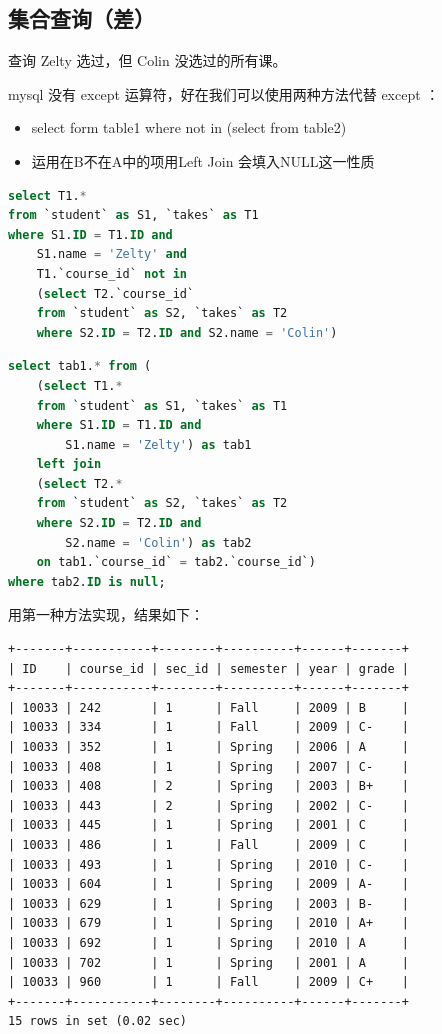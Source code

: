 \documentclass{article}
\begin{document}
\subsection{集合查询（差）}

查询 Zelty 选过，但 Colin 没选过的所有课。

mysql 没有 except 运算符，好在我们可以使用两种方法代替 except ：

\begin{itemize}
\item select form table1 where not in (select from table2)
\item 运用在B不在A中的项用Left Join 会填入NULL这一性质
\end{itemize}

\begin{lstlisting}[language=sql]
select T1.*
from `student` as S1, `takes` as T1
where S1.ID = T1.ID and 
	S1.name = 'Zelty' and
    T1.`course_id` not in
	(select T2.`course_id`
	from `student` as S2, `takes` as T2
	where S2.ID = T2.ID and S2.name = 'Colin')
\end{lstlisting}

\begin{lstlisting}[language=sql]
select tab1.* from (
	(select T1.*
	from `student` as S1, `takes` as T1
	where S1.ID = T1.ID and 
		S1.name = 'Zelty') as tab1
	left join
	(select T2.*
	from `student` as S2, `takes` as T2
	where S2.ID = T2.ID and
		S2.name = 'Colin') as tab2
	on tab1.`course_id` = tab2.`course_id`)
where tab2.ID is null;
\end{lstlisting}


用第一种方法实现，结果如下：

\begin{lstlisting}
+-------+-----------+--------+----------+------+-------+
| ID    | course_id | sec_id | semester | year | grade |
+-------+-----------+--------+----------+------+-------+
| 10033 | 242       | 1      | Fall     | 2009 | B     |
| 10033 | 334       | 1      | Fall     | 2009 | C-    |
| 10033 | 352       | 1      | Spring   | 2006 | A     |
| 10033 | 408       | 1      | Spring   | 2007 | C-    |
| 10033 | 408       | 2      | Spring   | 2003 | B+    |
| 10033 | 443       | 2      | Spring   | 2002 | C-    |
| 10033 | 445       | 1      | Spring   | 2001 | C     |
| 10033 | 486       | 1      | Fall     | 2009 | C     |
| 10033 | 493       | 1      | Spring   | 2010 | C-    |
| 10033 | 604       | 1      | Spring   | 2009 | A-    |
| 10033 | 629       | 1      | Spring   | 2003 | B-    |
| 10033 | 679       | 1      | Spring   | 2010 | A+    |
| 10033 | 692       | 1      | Spring   | 2010 | A     |
| 10033 | 702       | 1      | Spring   | 2001 | A     |
| 10033 | 960       | 1      | Fall     | 2009 | C+    |
+-------+-----------+--------+----------+------+-------+
15 rows in set (0.02 sec)

\end{lstlisting}
\end{document}
